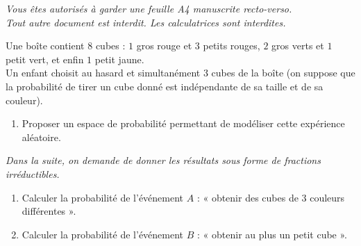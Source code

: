 \documentclass[a4paper,12pt,reqno]{amsart}
\begin{document}
\ifsolutions\else
\hfill\begin{minipage}[c]{.9\textwidth}
\emph{%
  Vous êtes autorisés à garder une feuille A4 manuscrite recto-verso.\\
  Tout autre document est interdit. Les calculatrices sont interdites.
}
\end{minipage}
\tsvp
\vspace*{\fill}
\fi


\begin{exo}

  Une boîte contient $8$ cubes : $1$ gros rouge et $3$ petits rouges, $2$ gros verts et $1$ petit vert, et enfin $1$ petit jaune.\\
  Un enfant choisit au hasard et simultanément 3 cubes de la boîte (on suppose que la probabilité de tirer un cube donné est indépendante de sa taille et de sa couleur).
  \begin{enumerate}
     \item Proposer un espace de probabilité  permettant de modéliser cette expérience aléatoire.
  \end{enumerate}
  \textit{Dans la suite, on demande de donner  les résultats sous forme de fractions irréductibles.}
  \begin{enumerate}[resume]
    \item Calculer la probabilité de l'événement $A$ : « obtenir des cubes de 3 couleurs différentes ».
    \item Calculer la probabilité de l'événement $B$ : « obtenir au plus un petit cube ».
  \end{enumerate}

\end{exo}
\end{document}
